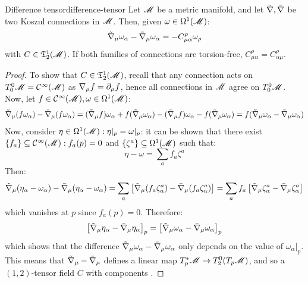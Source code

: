 \begin{lemma}{Difference tensor}{difference-tensor}
  Let $ \mathscr{M} $ be a metric manifold, and let $ \tilde{\nabla} , \bar{\nabla} $ be two Koszul connections in $ \mathscr{M} $. Then, given $ \omega \in \Omega^{1}(\mathscr{M}) $:
  \begin{equation}
    \tilde{\nabla}_\mu \omega_\alpha - \bar{\nabla}_\mu \omega_\alpha = - C^\rho_{\mu \alpha} \omega_\rho
    \label{eq:difference-tensor}
  \end{equation}
  with $ C \in \mathfrak{T}^{1}_{2}(\mathscr{M}) $. If both families of connections are torsion-free, $ C^\rho_{\mu \alpha} = C^\rho_{\alpha \mu} $.
\end{lemma}

\begin{proofbox}
  \begin{proof}
    To show that $ C \in \mathfrak{T}^{1}_{2}(\mathscr{M}) $, recall that any connection acts on $ T^0_0\mathscr{M} = \mathcal{C}^{\infty}(\mathscr{M}) $ as $ \nabla_\mu f = \partial_\mu f $, hence all connections in $ \mathscr{M} $ agree on $ T^0_0\mathscr{M} $. Now, let $ f \in \mathcal{C}^{\infty}(\mathscr{M}) , \omega \in \Omega^{1}(\mathscr{M}) $:
    \begin{equation*}
      \tilde{\nabla}_\mu (f \omega_\alpha) - \bar{\nabla}_\mu (f \omega_\alpha) = (\tilde{\nabla}_\mu f) \omega_\alpha + f (\tilde{\nabla}_\mu \omega_\alpha) - (\bar{\nabla}_\mu f) \omega_\alpha - f (\bar{\nabla}_\mu \omega_\alpha) = f (\tilde{\nabla}_\mu \omega_\alpha - \bar{\nabla}_\mu \omega_\alpha)
    \end{equation*}
    Now, consider $ \eta \in \Omega^{1}(\mathscr{M}) : \eta \vert_p = \omega \vert_p $: it can be shown that there exist $ \{f_a\} \subseteq \mathcal{C}^{\infty}(\mathscr{M}) : f_a(p) = 0 $ and $ \{\zeta^a\} \subseteq \Omega^{1}(\mathscr{M}) $ such that:
    \begin{equation*}
      \eta - \omega = \sum_a f_a \zeta^a
    \end{equation*}
    Then:
    \begin{equation*}
      \tilde{\nabla}_\mu (\eta_\alpha - \omega_\alpha) - \bar{\nabla}_\mu (\eta_\alpha - \omega_\alpha) = \sum_a \left[ \tilde{\nabla}_\mu (f_a \zeta^a_\alpha) - \bar{\nabla}_\mu (f_a \zeta^a_\alpha) \right] = \sum_a f_a \left[ \tilde{\nabla}_\mu \zeta^a_\alpha - \bar{\nabla}_\mu \zeta^a_\alpha \right]
    \end{equation*}
    which vanishes at $ p $ since $ f_a(p) = 0 $. Therefore:
    \begin{equation*}
      \left[ \tilde{\nabla}_\mu \eta_\alpha - \bar{\nabla}_\mu \eta_\alpha \right]_p = \left[ \tilde{\nabla}_\mu \omega_\alpha - \bar{\nabla}_\mu \omega_\alpha \right]_p
    \end{equation*}
    which shows that the difference $ \tilde{\nabla}_\mu \omega_\alpha - \bar{\nabla}_\mu \omega_\alpha $ only depends on the value of $ \omega_\alpha \vert_p $. This means that $ \tilde{\nabla}_\mu - \bar{\nabla}_\mu $ defines a linear map $ T_p^*\mathscr{M} \rightarrow T^0_2(T_p\mathscr{M}) $, and so a $ (1,2) $-tensor field $ C $ with components .


\end{proof}
\end{proofbox}
